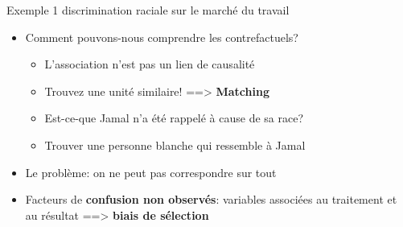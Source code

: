 \documentclass[ignorenonframetext,]{beamer}
\providecommand{\tightlist}{%
  \setlength{\itemsep}{0pt}\setlength{\parskip}{0pt}}
\begin{document}
\begin{frame}{Exemple 1 discrimination raciale sur le marché du travail}
\protect\hypertarget{exemple-1-discrimination-raciale-sur-le-marche-du-travail-3}{}

\begin{itemize}
\tightlist
\item
  Comment pouvons-nous comprendre les contrefactuels?

  \begin{itemize}
  \tightlist
  \item
    L'association n'est pas un lien de causalité
  \item
    Trouvez une unité similaire! ==\textgreater{} \textbf{Matching}
  \item
    Est-ce-que Jamal n'a été rappelé à cause de sa race?
  \item
    Trouver une personne blanche qui ressemble à Jamal
  \end{itemize}
\item
  Le problème: on ne peut pas correspondre sur tout
\item
  Facteurs de \textbf{confusion non observés}: variables associées au
  traitement et au résultat ==\textgreater{} \textbf{biais de sélection}
\end{itemize}

\end{frame}
\end{document}
